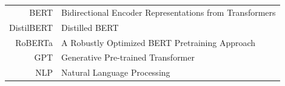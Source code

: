 \chapter{\thectufitabbreviationlabel}


\begin{tabular}{rl}
BERT & Bidirectional Encoder Representations from Transformers \\
DistilBERT & Distilled BERT \\
RoBERTa & A Robustly Optimized BERT Pretraining Approach \\
GPT & Generative Pre-trained Transformer \\
NLP & Natural Language Processing

\end{tabular}
\resumeTOCentries
\mainmatter\mainmatterinit %
